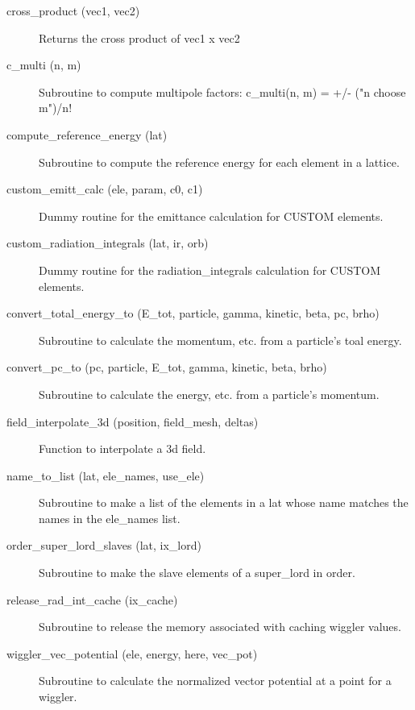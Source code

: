 \begin{description}

\item[cross_product (vec1, vec2)] \Newline 
Returns the cross product of vec1 x vec2

\item[c_multi (n, m)] \Newline
Subroutine to compute multipole factors: 
c_multi(n, m) = +/- ("n choose m")/n! 

\item[compute_reference_energy (lat)] \Newline
Subroutine to compute the reference energy for each element in a lattice. 

\item[custom_emitt_calc (ele, param, c0, c1)] \Newline
Dummy routine for the emittance calculation for CUSTOM elements. 

\item[custom_radiation_integrals (lat, ir, orb)] \Newline
Dummy routine for the radiation_integrals calculation for CUSTOM elements. 

\item[convert_total_energy_to (E_tot, particle, gamma, kinetic, beta, pc, brho)] \Newline
Subroutine to calculate the momentum, etc. from a particle's toal energy. 

\item[convert_pc_to (pc, particle, E_tot, gamma, kinetic, beta, brho)] \Newline
Subroutine to calculate the energy, etc. from a particle's momentum. 

\item[field_interpolate_3d (position, field_mesh, deltas)] \Newline
Function to interpolate a 3d field. 

\item[name_to_list (lat, ele_names, use_ele)] \Newline
Subroutine to make a list of the elements in a lat 
whose name matches the names in the ele_names list. 

\item[order_super_lord_slaves (lat, ix_lord)] \Newline
Subroutine to make the slave elements of a super_lord in order. 

\item[release_rad_int_cache (ix_cache)] \Newline 
     Subroutine to release the memory associated with caching wiggler values.

\item[wiggler_vec_potential (ele, energy, here, vec_pot)] \Newline
Subroutine to calculate the normalized vector potential at a point for a wiggler.

\end{description}

